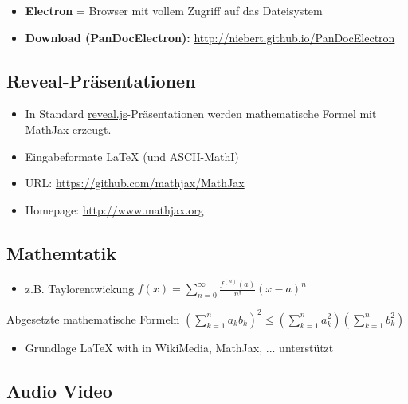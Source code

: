 \documentclass[]{article}
\providecommand{\tightlist}{%
  \setlength{\itemsep}{0pt}\setlength{\parskip}{0pt}}
\begin{document}
\begin{itemize}
\tightlist
\item
  \textbf{Electron} = Browser mit vollem Zugriff auf das Dateisystem
\item
  \textbf{Download (PanDocElectron):}
  \href{http://niebert.github.io/PanDocElectron}{\url{http://niebert.github.io/PanDocElectron}}
\end{itemize}

\subsection{Reveal-Präsentationen}\label{reveal-pruxe4sentationen}

\begin{itemize}
\tightlist
\item
  In Standard
  \href{https://github.com/hakimel/reveal.js}{reveal.js}-Präsentationen
  werden mathematische Formel mit MathJax erzeugt.
\item
  Eingabeformate LaTeX (und ASCII-MathI)
\item
  URL: \url{https://github.com/mathjax/MathJax}
\item
  Homepage: \url{http://www.mathjax.org}
\end{itemize}

\subsection{Mathemtatik}\label{mathemtatik}

\begin{itemize}
\tightlist
\item
  z.B. Taylorentwickung
  \(f(x)=\sum_{n=0}^\infty\frac{f^{(n)}(a)}{n!}(x-a)^n\)\\
\end{itemize}

Abgesetzte mathematische Formeln
\(\displaystyle  \left( \sum_{k=1}^n a_k b_k \right)^2 \leq \left( \sum_{k=1}^n a_k^2 \right) \left( \sum_{k=1}^n b_k^2 \right)\)

\begin{itemize}
\tightlist
\item
  Grundlage LaTeX with in WikiMedia, MathJax, ... unterstützt
\end{itemize}

\subsection{Audio Video}\label{audio-video}
\end{document}
